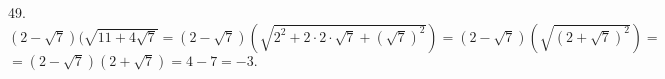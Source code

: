 49. $(2-\sqrt{7})(\sqrt{11+4\sqrt{7}}=(2-\sqrt{7})\left(\sqrt{2^2+2\cdot2\cdot\sqrt{7}+(\sqrt{7})^2}\right)=(2-\sqrt{7})\left(\sqrt{(2+\sqrt{7})^2}\right)=$\\$=
(2-\sqrt{7})(2+\sqrt{7})=4-7=-3.$\\

